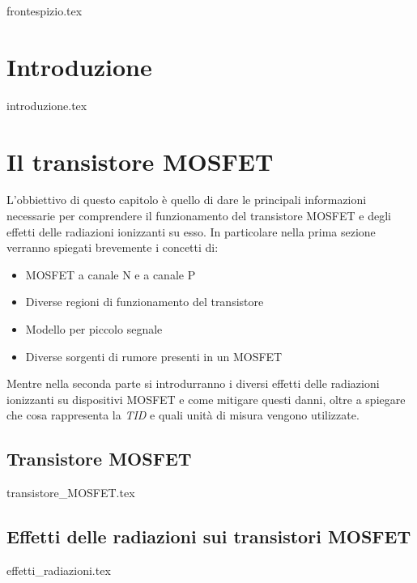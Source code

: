 \documentclass[
	a4paper,
	cleardoublepage=empty,
	headings=twolinechapter,
	numbers=autoenddot,
]{scrbook}
\begin{document}
\frontmatter

{frontespizio.tex}

\tableofcontents
\listoffigures

\listoftables 
\mainmatter

\chapter*{Introduzione}
{introduzione.tex}

\chapter{Il transistore MOSFET}
L'obbiettivo di questo capitolo è quello di dare le principali informazioni necessarie per comprendere il funzionamento del transistore MOSFET e degli effetti delle radiazioni ionizzanti su esso.
In particolare nella prima sezione verranno spiegati brevemente i concetti di:
\begin{itemize}     
\item MOSFET a canale N e a canale P
\item Diverse regioni di funzionamento del transistore
\item Modello per piccolo segnale
\item Diverse sorgenti di rumore presenti in un MOSFET
\end{itemize}
Mentre nella seconda parte si introdurranno i diversi effetti delle radiazioni ionizzanti su dispositivi MOSFET e come mitigare questi danni, oltre a spiegare che cosa rappresenta la \textit{TID} e quali unità di misura vengono utilizzate.

\section{Transistore MOSFET}
{transistore_MOSFET.tex}

\section{Effetti delle radiazioni sui transistori MOSFET}
{effetti_radiazioni.tex}
\end{document}
